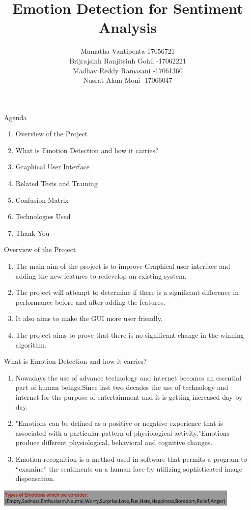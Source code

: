 \documentclass{beamer}
\title{Emotion Detection for Sentiment Analysis}
\author {\color{red} \item Mamatha Vantipenta-17056721  \item Brijrajsinh Ranjitsinh Gohil -17062221  \item Madhav Reddy Ramasani -17061360  \item Nusrat Alam Moni -17066047}
\begin{document}
\begin{frame}
    \titlepage
\end{frame}
\begin{frame}{Agenda}
\begin{enumerate}\vspace{12pt}
    \item Overview of the Project 
    \item What is Emotion Detection and how it carries?
    \item Graphical User Interface
    \item Related Tests and Training
    \item Confusion Matrix
    \item Technologies Used
       \item Thank You
\end{enumerate}
\end{frame}
\begin{frame}{Overview of the Project}\vspace{1pt}
\begin{enumerate}
\item The main aim of the project is to improve Graphical user interface and adding the new features to redevelop an existing system. 
\item The project will attempt to determine if there is a significant difference in performance before and after adding the features.
\item It also aims to make the GUI more user friendly.
\item The project aims to prove that there is no significant change in the winning algorithm.
\end{enumerate}
\end{frame}
\begin{frame}{What is Emotion Detection and how it carries?}
\begin {enumerate}
\item Nowadays the use of advance technology and internet becomes an essential part of human beings.Since last two decades the use of technology and internet for the purpose of entertainment and it is getting increased day by day.\item "Emotions can be defined as a positive or negative experience that is associated with a particular pattern of physiological activity."Emotions produce different physiological, behavioral and cognitive changes.\item Emotion recognition is a method used in software that permits a program to “examine” the sentiments on a human face by utilizing sophisticated image dispensation.
\end {enumerate}
    \centering
    \includegraphics[width=0.9\textwidth]{Emotions.PNG}
           
\end{frame}
\end{document}
